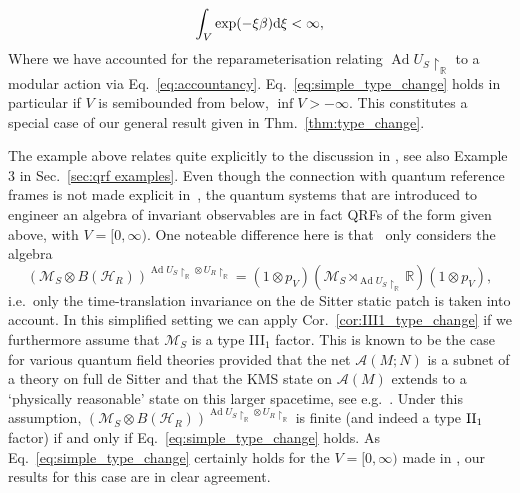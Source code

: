 \documentclass[sn-mathphys-num]{sn-jnl}%
\newcommand{\RR}{\mathbb{R}}
\newcommand{\HH}{\mathcal{H}}
\newcommand{\MM}{\mathcal{M}}
\DeclareMathOperator{\Ad}{Ad}
\newcommand{\diff}{\textup{d}}
\numberwithin{equation}{section}
\theoremstyle{thmstyleone}%
\theoremstyle{thmstyletwo}%
\theoremstyle{thmstylethree}%
\begin{document}
\begin{equation}
    \label{eq:simple_type_change}
    \int_V\exp(-\xi\beta)\diff \xi<\infty,
\end{equation}
Where we have accounted for the reparameterisation relating $\Ad U_S\restriction_\RR$ to a modular action via Eq.~\eqref{eq:accountancy}.
Eq.~\eqref{eq:simple_type_change} holds in particular if $V$ is semibounded from below, $\inf V>-\infty$. This constitutes a special case of our general result given in Thm.\ \ref{thm:type_change}. 

The example above relates quite explicitly to the discussion in \cite{chandrasekaran2023algebra}, see also Example 3 in Sec.~\ref{sec:qrf examples}. Even though the connection with quantum reference frames is not made explicit in~\cite{chandrasekaran2023algebra}, the quantum systems that are introduced to engineer an algebra of invariant observables are in fact QRFs of the form given above, with $V=[0,\infty)$. One noteable difference here is that~\cite{chandrasekaran2023algebra} only considers the algebra
\begin{equation}
    (\MM_S\otimes B(\HH_R))^{\Ad U_S\restriction_{\RR}\otimes U_R\restriction_{\RR}}=(1\otimes p_V)\left(\MM_S\rtimes_{\Ad U_S\restriction_\RR}\RR\right)(1\otimes p_V),
\end{equation}
i.e.\ only the time-translation invariance on the de Sitter static patch is taken into account. In this simplified setting we can apply Cor.\ \ref{cor:III1_type_change} if we furthermore assume that $\MM_S$ is a type III${}_1$ factor. This is known to be the case for various quantum field theories provided that the net $\mathcal{A}(M;N)$ is a subnet of a theory on full de Sitter and that the KMS state on $\mathcal{A}(M)$ extends to a `physically reasonable' state on this larger spacetime, see e.g.\ \cite[Thm.\ 3.6.g]{Verch:1996wv}. Under this assumption, $(\MM_S\otimes B(\HH_R))^{\Ad U_S\restriction_{\RR}\otimes U_R\restriction_{\RR}}$ is finite (and indeed a type $\textnormal{II}_1$ factor) if and only if Eq.\ \eqref{eq:simple_type_change} holds. As Eq.\ \eqref{eq:simple_type_change} certainly holds for the $V=[0,\infty)$ made in \cite{chandrasekaran2023algebra}, our results for this case are in clear agreement.
\end{document}
